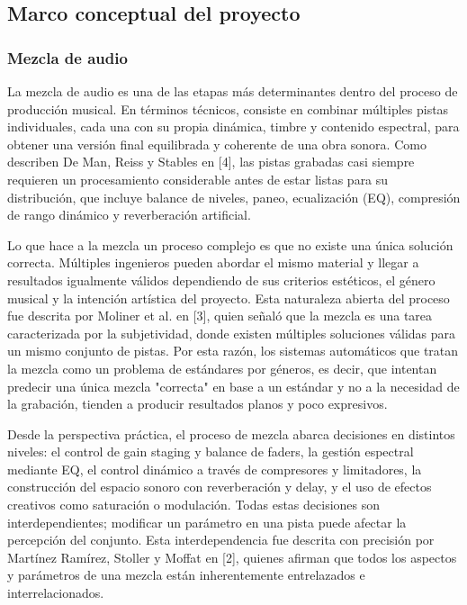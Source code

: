 \subsection*{Marco conceptual del proyecto}

\subsubsection*{Mezcla de audio}

La mezcla de audio es una de las etapas más determinantes dentro del proceso de producción musical. En términos técnicos, consiste en combinar múltiples pistas individuales, cada una con su propia dinámica, timbre y contenido espectral, para obtener una versión final equilibrada y coherente de una obra sonora. Como describen De Man, Reiss y Stables en [4], las pistas grabadas casi siempre requieren un procesamiento considerable antes de estar listas para su distribución, que incluye balance de niveles, paneo, ecualización (EQ), compresión de rango dinámico y reverberación artificial.

Lo que hace a la mezcla un proceso complejo es que no existe una única solución correcta. Múltiples ingenieros pueden abordar el mismo material y llegar a resultados igualmente válidos dependiendo de sus criterios estéticos, el género musical y la intención artística del proyecto. Esta naturaleza abierta del proceso fue descrita por Moliner et al. en [3], quien señaló que la mezcla es una tarea caracterizada por la subjetividad, donde existen múltiples soluciones válidas para un mismo conjunto de pistas. Por esta razón, los sistemas automáticos que tratan la mezcla como un problema de estándares por géneros, es decir, que intentan predecir una única mezcla "correcta" en base a un estándar y no a la necesidad de la grabación, tienden a producir resultados planos y poco expresivos.

Desde la perspectiva práctica, el proceso de mezcla abarca decisiones en distintos niveles: el control de gain staging y balance de faders, la gestión espectral mediante EQ, el control dinámico a través de compresores y limitadores, la construcción del espacio sonoro con reverberación y delay, y el uso de efectos creativos como saturación o modulación. Todas estas decisiones son interdependientes; modificar un parámetro en una pista puede afectar la percepción del conjunto. Esta interdependencia fue descrita con precisión por Martínez Ramírez, Stoller y Moffat en [2], quienes afirman que todos los aspectos y parámetros de una mezcla están inherentemente entrelazados e interrelacionados.

